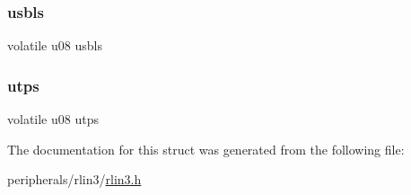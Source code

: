 \subsubsection{\texorpdfstring{usbls}{usbls}}
{\footnotesize\ttfamily volatile u08 usbls}

\mbox{\label{structrlin3__lbfc__uart_ab0cee39796e655c62464a5863d394e8d}} 
\subsubsection{\texorpdfstring{utps}{utps}}
{\footnotesize\ttfamily volatile u08 utps}



The documentation for this struct was generated from the following file\+:\begin{DoxyCompactItemize}
\item 
peripherals/rlin3/\mbox{\hyperlink{rlin3_8h}{rlin3.\+h}}\end{DoxyCompactItemize}
